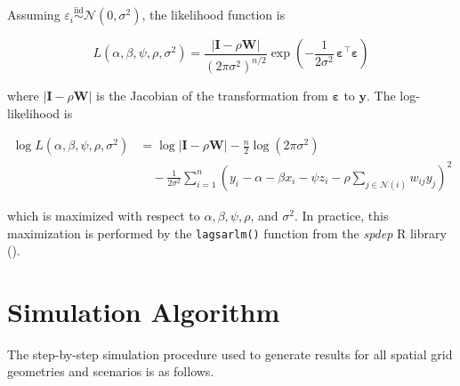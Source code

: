 \documentclass[
  12pt,
  prelim]{bios-prelim}
\begin{document}
Assuming
\(\varepsilon_i \overset{\text{iid}}{\sim} \mathcal{N}(0,\sigma^2)\),
the likelihood function is

\[
L\!\left(\alpha,\beta,\psi,\rho,\sigma^2\right)
= \frac{|\mathbf{I} - \rho\mathbf{W}|}{\left(2\pi\sigma^2\right)^{n/2}}
  \exp\!\left(-\frac{1}{2\sigma^2}\,\boldsymbol{\varepsilon}^{\top}\boldsymbol{\varepsilon}\right)
\]

where \(|\mathbf{I}-\rho\mathbf{W}|\) is the Jacobian of the
transformation from \(\boldsymbol{\varepsilon}\) to \(\mathbf{y}\). The
log-likelihood is

\[
\begin{aligned}
\log L\!\left(\alpha,\beta,\psi,\rho,\sigma^2\right)
&= \log|\mathbf{I} - \rho\mathbf{W}|
   - \frac{n}{2}\log\!\left(2\pi\sigma^2\right) \\
&\quad - \frac{1}{2\sigma^2}
    \sum_{i=1}^{n}
    \left(y_i - \alpha - \beta x_i - \psi z_i - \rho\sum_{j \in \mathcal{N}(i)}w_{ij}y_j\right)^{\!2}
\end{aligned}
\]

which is maximized with respect to \(\alpha, \beta, \psi, \rho\), and
\(\sigma^2\). In practice, this maximization is performed by the
\texttt{lagsarlm()} function from the \emph{spdep} R library
().

\section{Simulation Algorithm}\label{sec-apx-simalg}

The step-by-step simulation procedure used to generate results for all
spatial grid geometries and scenarios is as follows.
\end{document}
